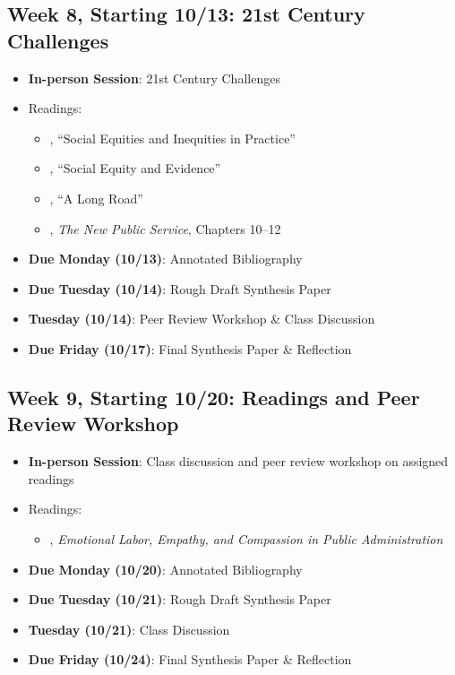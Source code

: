\documentclass[12pt]{article}     %
\begin{document}
\subsection*{Week 8, Starting 10/13: 21st Century Challenges}
\begin{itemize}
    \item \textbf{In-person Session}: 21st Century Challenges
    \item Readings:
        \begin{itemize}
            \item \citet{maynard-moody2012}, ``Social Equities and Inequities in Practice'' 
            \item \citet{GOODEN2017}, ``Social Equity and Evidence'' 
            \item \citet{mccandless2022}, ``A Long Road''
            \item \citet{Denhardt2015}, \emph{The New Public Service}, Chapters 10--12 
        \end{itemize}
    \item \textbf{Due Monday (10/13)}: Annotated Bibliography
    \item \textbf{Due Tuesday (10/14)}: Rough Draft Synthesis Paper
    \item \textbf{Tuesday (10/14)}: Peer Review Workshop \& Class Discussion
    \item \textbf{Due Friday (10/17)}: Final Synthesis Paper \& Reflection
\end{itemize}

\subsection*{Week 9, Starting 10/20: Readings and Peer Review Workshop}
\begin{itemize}
    \item \textbf{In-person Session}: Class discussion and peer review workshop on assigned readings
    \item Readings:
        \begin{itemize}
            \item \cite{guy2004emotional}, \emph{Emotional Labor, Empathy, and Compassion in Public Administration}
        \end{itemize}
    \item \textbf{Due Monday (10/20)}: Annotated Bibliography
    \item \textbf{Due Tuesday (10/21)}: Rough Draft Synthesis Paper
    \item \textbf{Tuesday (10/21)}: Class Discussion
    \item \textbf{Due Friday (10/24)}: Final Synthesis Paper \& Reflection
\end{itemize}
\end{document}
